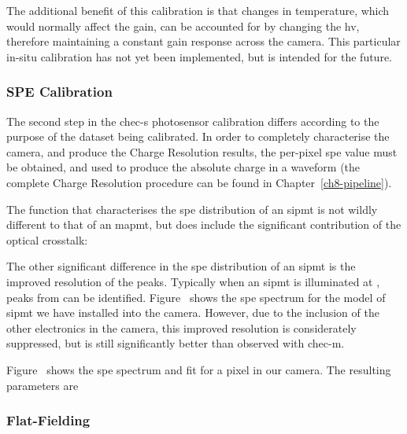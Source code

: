 
The additional benefit of this calibration is that changes in temperature, which would normally affect the gain, can be accounted for by changing the \gls{hv}, therefore maintaining a constant gain response across the camera. This particular in-situ calibration has not yet been implemented, but is intended for the future.


\subsubsection{SPE Calibration}

The second step in the \gls{chec-s} photosensor calibration differs according to the purpose of the dataset being calibrated. In order to completely characterise the camera, and produce the Charge Resolution results, the per-pixel \gls{spe} value must be obtained, and used to produce the absolute charge in a waveform (the complete Charge Resolution procedure can be found in Chapter~\ref{ch8-pipeline}).

The function that characterises the \gls{spe} distribution of an \gls{sipmt} is not wildly different to that of an \gls{mapmt}, but does include the significant contribution of the optical crosstalk:

The other significant difference in the \gls{spe} distribution of an \gls{sipmt} is the improved resolution of the peaks. Typically when an \gls{sipmt} is illuminated at , peaks from  can be identified. Figure~ shows the \gls{spe} spectrum for the model of \gls{sipmt} we have installed into the camera. However, due to the inclusion of the other electronics in the camera, this improved resolution is considerately suppressed, but is still significantly better than observed with \gls{chec-m}.

Figure~ shows the \gls{spe} spectrum and fit for a pixel in our camera. The resulting parameters are 

\subsubsection{Flat-Fielding}

